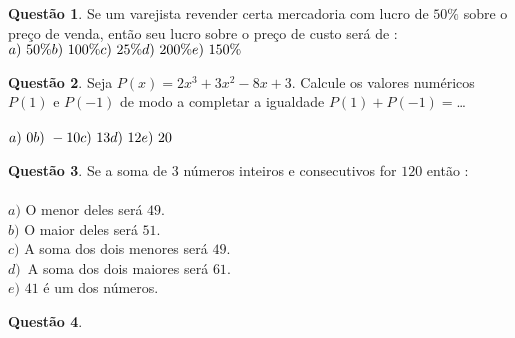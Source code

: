 \documentclass[11pt, twocolumn]{article}
\renewcommand{\=}[1]{\stackrel{#1}{=}} 																					%
\theoremstyle{definition}
\newtheorem{quest}{Quest\~ao}
\begin{document}
\hline
\vfill

\begin{quest}
	Se um varejista revender certa mercadoria com lucro de $50\%$ sobre o pre\c{c}o de venda, ent\~ao seu lucro sobre o pre\c{c}o de custo ser\'a de : \\
	\(\displaystyle a)\ 50\% \hfill b)\ 100\% \hfill c)\ 25\% \hfill d)\ 200\% \hfill e)\ 150\% \)
\end{quest}

\hline
\vfill

\begin{quest}
	Seja $P(x) = 2x^3+3x^2-8x+3$. Calcule os valores num\'ericos $P(1)$ e $P(-1)$ de modo a completar a igualdade $P(1) + P(-1) =$\dots \\ \\
	\(\displaystyle a)\ 0 \hfill b)\ -10 \hfill c)\ 13 \hfill d)\ 12 \hfill e)\ 20 \)
\end{quest}

\hline
\vfill

\begin{quest}
	Se a soma de $3$ n\'umeros inteiros e consecutivos for $120$ ent\~ao :\\\\
	$a)$ O menor deles ser\'a $49$. \\ $b)$ O maior deles ser\'a $51$. \\ $c)$ A soma dos dois menores ser\'a $49$. \\ $d)$\ A soma dos dois maiores ser\'a $61$. \\ $e)$ $41$ \'e um dos n\'umeros.
\end{quest}

\hline
\vfill

\begin{quest}

\end{quest}
\end{document}
